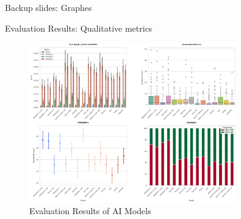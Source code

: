 \documentclass{beamer}
\begin{document}
\begin{frame}[plain]
  
  \centering
  \vspace{1cm}
  \Huge Backup slides: Graphes
\end{frame}

\begin{frame}{Evaluation Results: Qualitative metrics}
  \begin{figure}
    \centering
    \includegraphics[width=0.8\textwidth]{combined_metrics.png}
    \caption{Evaluation Results of AI Models}
    \label{fig:evaluation-results}
  \end{figure}
\end{frame}
\end{document}
